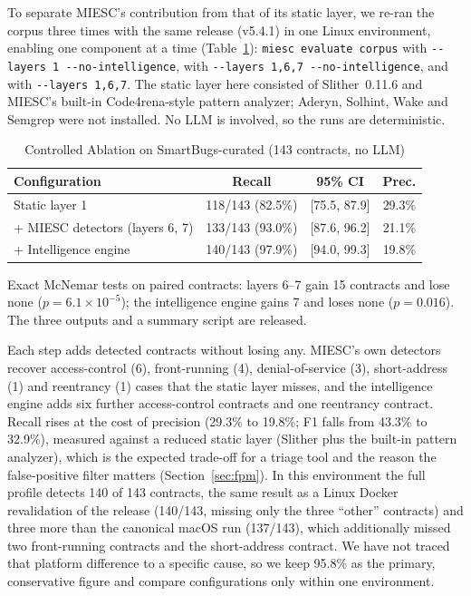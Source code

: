 \documentclass[conference]{IEEEtran}
\begin{document}
To separate MIESC's contribution from that of its static layer, we re-ran the corpus three times with the same release (v5.4.1) in one Linux environment, enabling one component at a time (Table~\ref{tab:ablation}): \texttt{miesc evaluate corpus} with \texttt{-{}-layers 1 -{}-no-intelligence}, with \texttt{-{}-layers 1,6,7 -{}-no-intelligence}, and with \texttt{-{}-layers 1,6,7}. The static layer here consisted of Slither~0.11.6 and MIESC's built-in Code4rena-style pattern analyzer; Aderyn, Solhint, Wake and Semgrep were not installed. No LLM is involved, so the runs are deterministic.

\begin{table}[htbp]
\caption{Controlled Ablation on SmartBugs-curated (143 contracts, no LLM)}
\label{tab:ablation}
\centering
\footnotesize
\setlength{\tabcolsep}{3pt}
\begin{tabular}{@{}lccc@{}}
\toprule
\textbf{Configuration} & \textbf{Recall} & \textbf{95\% CI} & \textbf{Prec.} \\
\midrule
Static layer 1 & 118/143 (82.5\%) & [75.5, 87.9] & 29.3\% \\
+ MIESC detectors (layers 6, 7) & 133/143 (93.0\%) & [87.6, 96.2] & 21.1\% \\
+ Intelligence engine & 140/143 (97.9\%) & [94.0, 99.3] & 19.8\% \\
\bottomrule
\end{tabular}

\vspace{2pt}
\scriptsize{Exact McNemar tests on paired contracts: layers 6--7 gain 15 contracts and lose none ($p=6.1\times10^{-5}$); the intelligence engine gains 7 and loses none ($p=0.016$). The three outputs and a summary script are released.}
\end{table}

Each step adds detected contracts without losing any. MIESC's own detectors recover access-control (6), front-running (4), denial-of-service (3), short-address (1) and reentrancy (1) cases that the static layer misses, and the intelligence engine adds six further access-control contracts and one reentrancy contract. Recall rises at the cost of precision (29.3\% to 19.8\%; F1 falls from 43.3\% to 32.9\%), measured against a reduced static layer (Slither plus the built-in pattern analyzer), which is the expected trade-off for a triage tool and the reason the false-positive filter matters (Section~\ref{sec:fpm}). In this environment the full profile detects 140 of 143 contracts, the same result as a Linux Docker revalidation of the release (140/143, missing only the three ``other'' contracts) and three more than the canonical macOS run (137/143), which additionally missed two front-running contracts and the short-address contract. We have not traced that platform difference to a specific cause, so we keep 95.8\% as the primary, conservative figure and compare configurations only within one environment.
\end{document}
